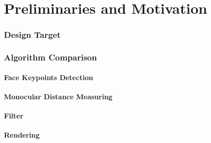 \part{Preliminaries and Motivation}
\section{Design Target}

\section{Algorithm Comparison}

\subsection{Face Keypoints Detection}

\subsection{Monocular Distance Measuring}

\subsection{Filter}

\subsection{Rendering}
